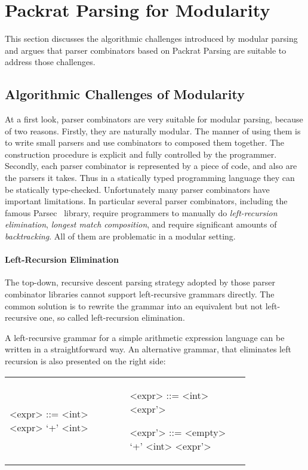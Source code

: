 \section{Packrat Parsing for Modularity}\label{sec:packrat}

This section discusses the algorithmic challenges introduced by modular parsing and argues that parser combinators based on Packrat Parsing 
are suitable to address those challenges.

\subsection{Algorithmic Challenges of Modularity}
At a first look, parser combinators are very suitable for modular parsing, because of two reasons. Firstly, they are naturally modular. The manner of using them is to write small parsers and use combinators to composed them together. The construction procedure is explicit and fully controlled by the programmer. Secondly, each parser combinator is represented by a piece of code, and also are the parsers it takes. Thus in a statically typed programming language they can be statically type-checked. 
Unfortunately many parser combinators have important limitations.
In particular several parser combinators,
including the famous Parsec~\cite{Leijen2001} library, require
programmers to manually do \textit{left-recursion elimination}, \textit{longest match composition}, and
require significant amounts of \textit{backtracking}. All of them are
problematic in a modular setting.

\paragraph{Left-Recursion Elimination} The top-down, recursive descent parsing strategy adopted by those parser combinator libraries cannot support left-recursive grammars directly. The common solution is to rewrite the grammar into an equivalent but not left-recursive one, so called left-recursion elimination.

A left-recursive grammar for a simple arithmetic expression language can be written in a straightforward way. An alternative grammar, that eliminates left recursion is also presented on the right side:

\begin{tabular}{m{0.4\linewidth}m{0.4\linewidth}}
\setlength{\grammarindent}{5em}
\begin{grammar}
<expr> ::= <int> \alt <expr> `+' <int>
\end{grammar}
&
\setlength{\grammarindent}{5em}
\begin{grammar}
<expr> ::= <int> <expr'>

<expr'> ::= <empty> \alt `+' <int> <expr'>
\end{grammar}
\end{tabular}

